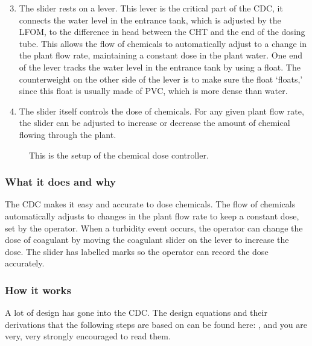 \documentclass[letterpaper,10pt,english]{sphinxmanual}
\let\sphinxpxdimen\pdfpxdimen\else\newdimen\sphinxpxdimen
\begin{document}
\begin{enumerate}
\setcounter{enumi}{2}
\item {} 
The slider rests on a lever. This lever is the critical part of the CDC, it connects the water level in the entrance tank, which is adjusted by the LFOM, to the difference in head between the CHT and the end of the dosing tube. This allows the flow of chemicals to automatically adjust to a change in the plant flow rate, maintaining a constant dose in the plant water. One end of the lever tracks the water level in the entrance tank by using a float. The counterweight on the other side of the lever is to make sure the float ‘floats,’ since this float is usually made of PVC, which is more dense than water.

\item {} 
The slider itself controls the dose of chemicals. For any given plant flow rate, the slider can be adjusted to increase or decrease the amount of chemical flowing through the plant.

\end{enumerate}

\begin{figure}[htbp]
\centering
\capstart

\noindent\sphinxincludegraphics[width=600\sphinxpxdimen]{{cdc_labelled}.png}
\caption{This is the setup of the chemical dose controller.}\label{\detokenize{Flow_Control_and_Measurement/FCM_Design:id17}}\label{\detokenize{Flow_Control_and_Measurement/FCM_Design:cdc-labelled}}\end{figure}


\subsubsection{What it does and why}
\label{\detokenize{Flow_Control_and_Measurement/FCM_Design:id10}}
The CDC makes it easy and accurate to dose chemicals. The flow of chemicals automatically adjusts to changes in the plant flow rate to keep a constant dose, set by the operator. When a turbidity event occurs, the operator can change the dose of coagulant by moving the coagulant slider  on the lever to increase the dose. The slider has labelled marks so the operator can record the dose accurately.


\subsubsection{How it works}
\label{\detokenize{Flow_Control_and_Measurement/FCM_Design:id11}}
A lot of design has gone into the CDC. The design equations and their derivations that the following steps are based on can be found here: {\hyperref[\detokenize{Flow_Control_and_Measurement/FCM_Derivations:design-equations-for-the-cdc}]{}}, and you are very, very strongly encouraged to read them.
\end{document}
